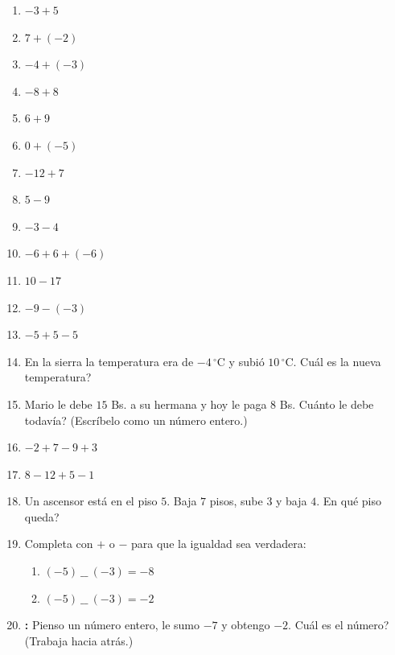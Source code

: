 \documentclass[12pt, letterpaper]{article}
\begin{document}
\begin{enumerate}[leftmargin=*, start=35]
  \item \facil{} $-3 + 5$

  \item \facil{} $7 + (-2)$

  \item \facil{} $-4 + (-3)$

  \item \facil{} $-8 + 8$

  \item \facil{} $6 + 9$

  \item \facil{} $0 + (-5)$

  \item \medio{} $-12 + 7$

  \item \medio{} $5 - 9$

  \item \medio{} $-3 - 4$

  \item \medio{} $-6 + 6 + (-6)$

  \item \medio{} $10 - 17$

  \item \medio{} $-9 - (-3)$

  \item \medio{} $-5 + 5 - 5$

  \item \medio{} En la sierra la temperatura era de $-4\,^{\circ}$C y subió $10\,^{\circ}$C. \textquestiondown Cuál es la nueva temperatura?

  \item \medio{} Mario le debe $15$ Bs. a su hermana y hoy le paga $8$ Bs. \textquestiondown Cuánto le debe todavía? (Escríbelo como un número entero.)

  \item \dificil{} $-2 + 7 - 9 + 3$

  \item \dificil{} $8 - 12 + 5 - 1$

  \item \dificil{} Un ascensor está en el piso $5$. Baja $7$ pisos, sube $3$ y baja $4$. \textquestiondown En qué piso queda?

  \item \dificil{} Completa con $+$ o $-$ para que la igualdad sea verdadera:
        \begin{enumerate}[label=\alph*)]
          \item $(-5) \ \_\_ \ (-3) = -8$
          \item $(-5) \ \_\_ \ (-3) = -2$
        \end{enumerate}

  \item \dificil{} \textbf{:} Pienso un número entero, le sumo $-7$ y obtengo $-2$. \textquestiondown Cuál es el número? (Trabaja hacia atrás.)
\end{enumerate}
\end{document}

